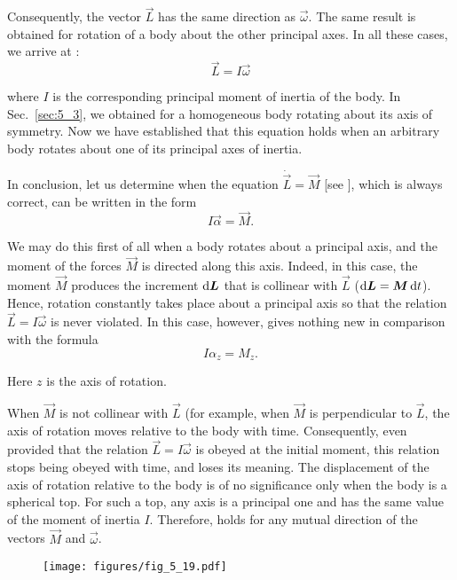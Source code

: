 \noindent
Consequently, the vector $\vec{L}$ has the same direction as $\vec{\omega}$. The same result is obtained for rotation of a body about the other principal axes. In all these cases, we arrive at :
\begin{equation*}
\vec{L} = I\vec{\omega}
\end{equation*}

\noindent
where $I$ is the corresponding principal moment of inertia of the body. In Sec.~\ref{sec:5_3}, we obtained  for a homogeneous body rotating about its axis of symmetry. Now we have established that this equation holds when an arbitrary body rotates about one of its principal axes of inertia.

In conclusion, let us determine when the equation $\dot{\vec{L}}=\vec{M}$ [see ], which is always correct, can be written in the form
\begin{equation}\label{eq:5_44}
I \vec{\alpha} = \vec{M}.
\end{equation}

We may do this first of all when a body rotates about a principal axis, and the moment of the forces $\vec{M}$ is directed along this axis. Indeed, in this case, the moment $\vec{M}$ produces the increment $\mathrm{d}\boldsymbol{L}$ that is collinear with $\vec{L}$ ($\mathrm{d}\boldsymbol{L}=\boldsymbol{M}\,\mathrm{d} t$). Hence, rotation constantly takes place about a principal axis so that the relation $\vec{L}=I\vec{\omega}$ is never violated. In this case, however,  gives nothing new in comparison with the formula
\begin{equation}\label{eq:5_45}
	I\alpha_z = M_z.
\end{equation}

\noindent
Here $z$ is the axis of rotation.

When $\vec{M}$ is not collinear with $\vec{L}$ (for example, when $\vec{M}$ is perpendicular to $\vec{L}$, the axis of rotation moves relative to the body with time. Consequently, even provided that the relation $\vec{L}=I\vec{\omega}$ is obeyed at the initial moment, this relation stops being obeyed with time, and  loses its meaning. The displacement of the axis of rotation relative to the body is of no significance only when the body is a spherical top. For such a top, any axis is a principal one and has the same value of the moment of inertia $I$. Therefore,  holds for any mutual direction of the vectors $\vec{M}$ and $\vec{\omega}$.

\begin{figure}[t]
	\begin{center}
		\texttt{[image: figures/fig\_5\_19.pdf]}
		\caption[]{}
		\label{fig:5_19}
	\end{center}
	\vspace{-0.6cm}
\end{figure}

